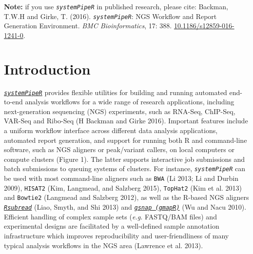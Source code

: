 \documentclass[14pt,]{article}
\author{Author: Daniela Cassol (danielac@ucr.edu) and Thomas Girke (thomas.girke@ucr.edu)}
\date{Last update: 28 January, 2021}
\begin{document}
\maketitle


{
\setcounter{tocdepth}{2}
\tableofcontents
\newpage
}
\textbf{Note:} if you use \emph{\texttt{systemPipeR}} in published research, please cite:
Backman, T.W.H and Girke, T. (2016). \emph{\texttt{systemPipeR}}: NGS Workflow and Report Generation Environment. \emph{BMC Bioinformatics}, 17: 388. \href{https://doi.org/10.1186/s12859-016-1241-0}{10.1186/s12859-016-1241-0}.

\hypertarget{introduction}{%
\section{Introduction}\label{introduction}}

\href{http://www.bioconductor.org/packages/devel/bioc/html/systemPipeR.html}{\emph{\texttt{systemPipeR}}} provides flexible utilities for building and running automated end-to-end analysis workflows for a wide range of research applications, including next-generation sequencing (NGS) experiments, such as RNA-Seq, ChIP-Seq, VAR-Seq and Ribo-Seq (H Backman and Girke 2016). Important features include a uniform workflow interface across different data analysis applications, automated report generation, and support for running both R and command-line software, such as NGS aligners or peak/variant callers, on local computers or compute clusters (Figure 1). The latter supports interactive job submissions and batch submissions to queuing systems of clusters. For instance, \emph{\texttt{systemPipeR}} can be used with most command-line aligners such as \texttt{BWA} (Li 2013; Li and Durbin 2009), \texttt{HISAT2} (Kim, Langmead, and Salzberg 2015), \texttt{TopHat2} (Kim et al. 2013) and \texttt{Bowtie2} (Langmead and Salzberg 2012), as well as the R-based NGS aligners \href{http://www.bioconductor.org/packages/devel/bioc/html/Rsubread.html}{\emph{\texttt{Rsubread}}} (Liao, Smyth, and Shi 2013) and \href{http://www.bioconductor.org/packages/devel/bioc/html/gmapR.html}{\emph{\texttt{gsnap (gmapR)}}} (Wu and Nacu 2010). Efficient handling of complex sample sets (\emph{e.g.} FASTQ/BAM files) and experimental designs are facilitated by a well-defined sample annotation infrastructure which improves reproducibility and user-friendliness of many typical analysis workflows in the NGS area (Lawrence et al. 2013).
\end{document}
